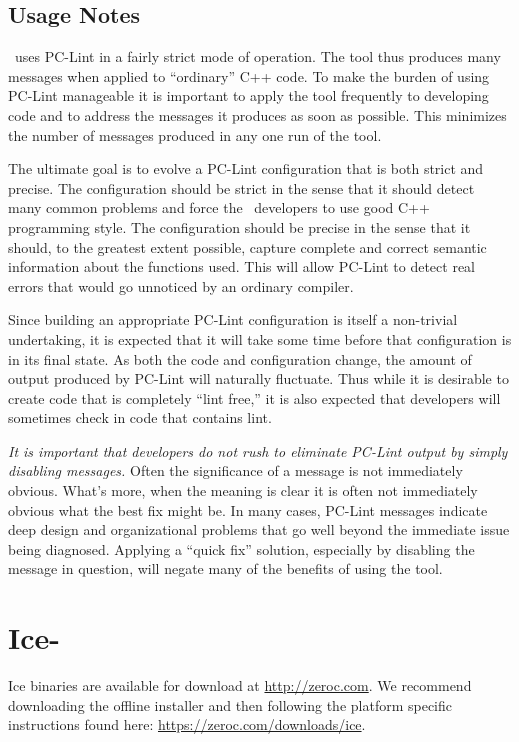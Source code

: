 \subsection{Usage Notes}

\VTank\ uses PC-Lint in a fairly strict mode of operation. The tool thus produces many messages when applied to ``ordinary'' C++ code. To make the burden of using PC-Lint manageable it is important to apply the tool frequently to developing code and to address the messages it produces as soon as possible. This minimizes the number of messages produced in any one run of the tool.

The ultimate goal is to evolve a PC-Lint configuration that is both strict and precise. The configuration should be strict in the sense that it should detect many common problems and force the \VTank\ developers to use good C++ programming style. The configuration should be precise in the sense that it should, to the greatest extent possible, capture complete and correct semantic information about the functions used. This will allow PC-Lint to detect real errors that would go unnoticed by an ordinary compiler.

Since building an appropriate PC-Lint configuration is itself a non-trivial undertaking, it is expected that it will take some time before that configuration is in its final state. As both the code and configuration change, the amount of output produced by PC-Lint will naturally fluctuate. Thus while it is desirable to create code that is completely ``lint free,'' it is also expected that developers will sometimes check in code that contains lint.

\emph{It is important that developers do not rush to eliminate PC-Lint output by simply disabling messages.} Often the significance of a message is not immediately obvious. What's more, when the meaning is clear it is often not immediately obvious what the best fix might be. In many cases, PC-Lint messages indicate deep design and organizational problems that go well beyond the immediate issue being diagnosed. Applying a ``quick fix'' solution, especially by disabling the message in question, will negate many of the benefits of using the tool.

\section{Ice-\IceVersion}

Ice binaries are available for download at \url{http://zeroc.com}. We recommend downloading the
offline installer and then following the platform specific instructions found here:
\url{https://zeroc.com/downloads/ice}.

